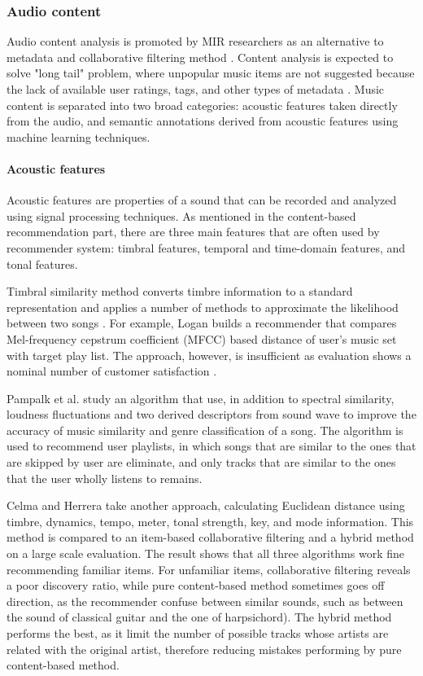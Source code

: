 \subsubsection{Audio content}
Audio content analysis is promoted by MIR researchers as an alternative to metadata and collaborative filtering method \cite{barrington2009smarter}. Content analysis is expected to solve "long tail" problem, where unpopular music items are not suggested because the lack of available user ratings, tags, and other types of metadata \cite{celma2009music}. Music content is separated into two broad categories: acoustic features taken directly from the audio, and semantic annotations derived from acoustic features using machine learning techniques. 

\paragraph{Acoustic features}
Acoustic features are properties 	of a sound that can be recorded and analyzed using signal processing techniques. As mentioned in the content-based recommendation part, there are three main features that are often used by recommender system: timbral features, temporal and time-domain features, and tonal features.

Timbral similarity method converts timbre information to a standard representation and applies a number of methods to approximate the likelihood between two songs \cite{aucouturier2005way} \cite{logan2001music}. For example, Logan \cite{logan2004music} builds a recommender that compares Mel-frequency cepstrum coefficient (MFCC) based distance of user's music set with target play list. The approach, however, is insufficient as evaluation shows a nominal number of customer satisfaction \cite{bogdanov2013semantic}. 

Pampalk et al. \cite{pampalk2005improvements} \cite{pampalk2005dynamic} study an algorithm that use, in addition to spectral similarity, loudness fluctuations and two derived descriptors from sound wave to improve the accuracy of music similarity and genre classification of a song. The algorithm is used to recommend user playlists, in which songs that are similar to the ones that are skipped by user are eliminate, and only tracks that are similar to the ones that the user wholly listens to remains.

Celma and Herrera \cite{celma2008new} take another approach, calculating Euclidean distance using timbre, dynamics, tempo, meter, tonal strength, key, and mode information. This method is compared to an item-based collaborative filtering and a hybrid method on a large scale evaluation. The result shows that all three algorithms work fine recommending familiar items. For unfamiliar items, collaborative filtering reveals a poor discovery ratio, while pure content-based method sometimes goes off direction, as the recommender confuse between similar sounds, such as between the sound of classical guitar and the one of harpsichord). The hybrid method performs the best, as it limit the number of possible tracks whose artists are related with the original artist, therefore reducing mistakes performing by pure content-based method.

